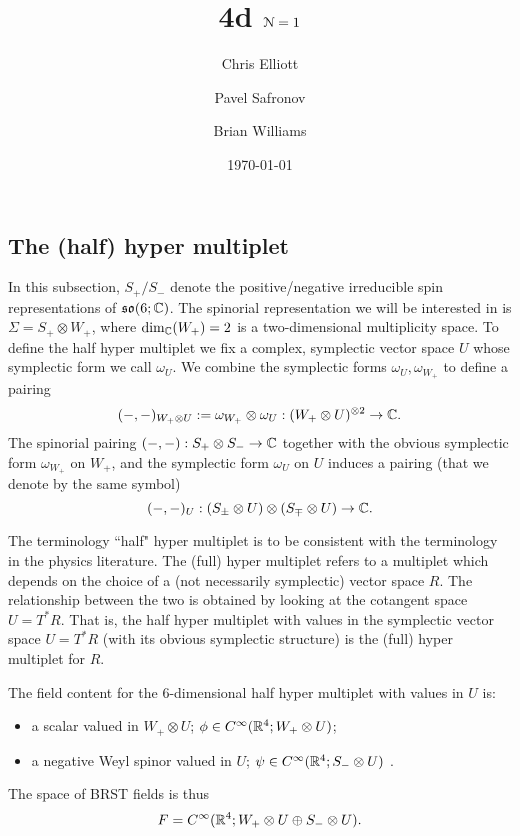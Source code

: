 \documentclass[10pt, oneside]{article}
\title{4d $\mathcal N=1$}
\author{Chris Elliott\and Pavel Safronov \and Brian Williams}
\date{\today}
\begin{document}
\maketitle

\subsection{The (half) hyper multiplet}

In this subsection, $S_+ / S_-$ denote the positive/negative irreducible spin representations of $\mathfrak{so}(6; \mathbb C)$. 
The spinorial representation we will be interested in is $\Sigma = S_+ \otimes W_+$, where $\dim_{\mathbb C}(W_+) = 2$ is a two-dimensional multiplicity space. 
To define the half hyper multiplet we fix a complex, symplectic vector space $U$ whose symplectic form we call $\omega_U$.
We combine the symplectic forms $\omega_U, \omega_{W_+}$ to define a pairing 
\[
(-,-)_{W_+ \otimes U}  := \omega_{W_+} \otimes \omega_U : (W_+ \otimes U)^{\otimes 2} \to \mathbb C .
\]
The spinorial pairing $(-,-) : S_+ \otimes S_- \to \mathbb C$ together with the obvious symplectic form $\omega_{W_+}$ on $W_+$, and the symplectic form $\omega_U$ on $U$ induces a pairing (that we denote by the same symbol)
\[
(-,-)_U : (S_\pm \otimes U) \otimes (S_\mp \otimes U) \to \mathbb C .
\]

\begin{remark}
The terminology ``half" hyper multiplet is to be consistent with the terminology in the physics literature. 
The (full) hyper multiplet refers to a multiplet which depends on the choice of a (not necessarily symplectic) vector space $R$. 
The relationship between the two is obtained by looking at the cotangent space $U = T^*R$.
That is, the half hyper multiplet with values in the symplectic vector space $U = T^* R$ (with its obvious symplectic structure) is the (full) hyper multiplet for $R$. 
\end{remark}

The field content for the 6-dimensional half hyper multiplet with values in $U$ is:
\begin{itemize}
\item a scalar valued in $W_+ \otimes U$; $\phi \in C^\infty(\mathbb R^4 ; W_+ \otimes U)$;
\item a negative Weyl spinor valued in $U$; $\psi \in C^\infty(\mathbb R^4 ; S_- \otimes U)$ .
\end{itemize}

The space of BRST fields is thus
\[
F = C^\infty(\mathbb R^4 ; W_+ \otimes U \oplus S_- \otimes U) .
\]
\end{document}
